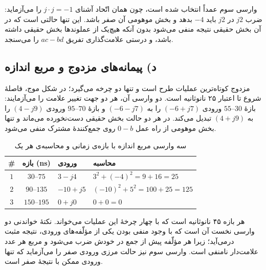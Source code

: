 \documentclass[12pt,a4paper]{article}
\begin{document}
	وارسی سوم عمداً انتخاب شده است، چون همان اتّحاد آشنای \(j\cdot j=-1\) را می‌آزماید: ضرب \(j2\) در \(j2\) باید \(-4\) بدهد و بخش موهومی آن صفر باشد. این تنها حالتی است که در آن بخش حقیقی نتیجه منفی می‌شود بدون آنکه هیچ‌یک از عملوندها بخش حقیقی داشته باشد، و درستی علامت‌گذاری تفریق \(ac-bd\) را می‌سنجد.

	\subsection*{د) پیمانه‌های مزدوج و مربع اندازه}

	مزدوج کوتاه‌ترین عملیات طرح است و تنها دو چرخه می‌گیرد؛ در شکل موج، فاصلهٔ شروع تا اعتبار ۲۵ نانوثانیه است. دو وارسی آن، هر دو جهت تغییر علامت را می‌آزمایند: بازهٔ \(30\)--\(55\) ورودی \((-6+j7)\) را به \((-6-j7)\) و بازهٔ \(70\)--\(95\) ورودی \((4-j9)\) را به \((4+j9)\) تبدیل می‌کند. در هر دو حالت بخش حقیقی دست‌نخورده می‌ماند و تنها بخش موهومی از راه عمل \(0-b\) روی جمع‌کنندهٔ مشترک منفی می‌شود.


	\begin{table}[H]
		\centering
		\footnotesize
		\begin{tabular}{|c|c|l|l|}
			\hline
			\textbf{\#} & \textbf{بازه (ns)} & \textbf{ورودی} & \textbf{محاسبه} \\ \hline
			\(1\) & \(30\)--\(75\)   & \(3-j4\)   & \(3^2+(-4)^2=9+16=25\) \\ \hline
			\(2\) & \(90\)--\(135\)  & \(-10+j5\) & \((-10)^2+5^2=100+25=125\) \\ \hline
			\(3\) & \(150\)--\(195\) & \(0+j0\)   & \(0+0=0\) \\ \hline
		\end{tabular}
		\caption{سه وارسی مربع اندازه با بازه‌ی زمانی و محاسبه‌ی هر یک}
	\end{table}

	هر بازه ۴۵ نانوثانیه است که با چهار چرخهٔ این عملیات می‌خواند. نکتهٔ خواندنی دو وارسی نخست آن است که با وجود منفی بودن یکی از مؤلّفه‌های ورودی، نتیجه مثبت درمی‌آید؛ زیرا هر مؤلّفه پیش از جمع در خودش ضرب می‌شود و مربع هر عدد علامت‌دار نامنفی است. وارسی سوم نیز حالت مرزی ورودی صفر را می‌آزماید که تنها ورودی ممکن با نتیجهٔ صفر است.
\end{document}
